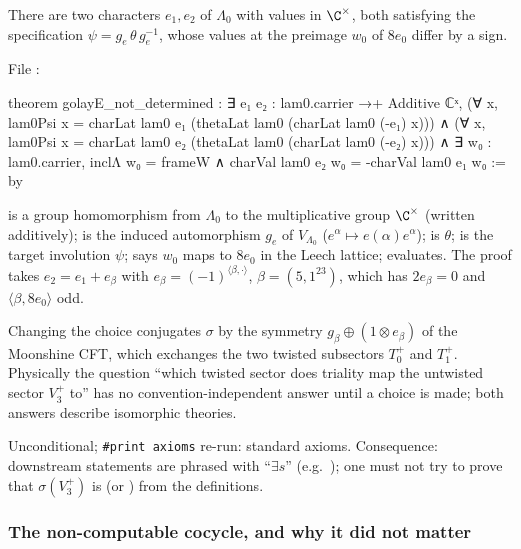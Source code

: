 \begin{theorem}\label{ch15:thm:golayE}
There are two characters $e_1,e_2$ of $\Lambda_0$ with values in $\C^\times$, both satisfying the
specification $\psi=g_e\,\theta\,g_e^{-1}$, whose values at the preimage $w_0$ of $8e_0$ differ by a
sign.
\end{theorem}
File :
\begin{leancode}
theorem golayE_not_determined :
    ∃ e₁ e₂ : lam0.carrier →+ Additive ℂˣ,
      (∀ x, lam0Psi x = charLat lam0 e₁ (thetaLat lam0 (charLat lam0 (-e₁) x))) ∧
      (∀ x, lam0Psi x = charLat lam0 e₂ (thetaLat lam0 (charLat lam0 (-e₂) x))) ∧
      ∃ w₀ : lam0.carrier, inclΛ w₀ = frameW ∧ charVal lam0 e₂ w₀ = -charVal lam0 e₁ w₀ := by
\end{leancode}
\begin{dictionary}
 is a group homomorphism from $\Lambda_0$ to the multiplicative
group $\C^\times$ (written additively);  is the induced automorphism $g_e$ of
$V_{\Lambda_0}$ ($e^\alpha\mapsto e(\alpha)e^\alpha$);  is $\theta$;  is
the target involution $\psi$;  says $w_0$ maps to $8e_0$ in the Leech
lattice;  evaluates. The proof takes $e_2=e_1+e_\beta$ with $e_\beta=(-1)^{\langle\beta,\cdot\rangle}$,
$\beta=(5,1^{23})$, which has $2e_\beta=0$ and $\langle\beta,8e_0\rangle$ odd.
\end{dictionary}
\begin{physics}
Changing the choice conjugates $\sigma$ by the symmetry $g_\beta\oplus(1\otimes e_\beta)$ of the
Moonshine CFT, which exchanges the two twisted subsectors $T_0^+$ and $T_1^+$. Physically the
question ``which twisted sector does triality map the untwisted sector $V_3^+$ to'' has no
convention-independent answer until a choice is made; both answers describe isomorphic theories.
\end{physics}
\begin{status}
Unconditional; \texttt{\#print axioms} re-run: standard axioms. Consequence: downstream statements
are phrased with ``$\exists s$'' (e.g.\ ); one must not try to prove that
$\sigma(V_3^+)$ is  (or ) from the definitions.
\end{status}

\subsubsection{The non-computable cocycle, and why it did not matter}

